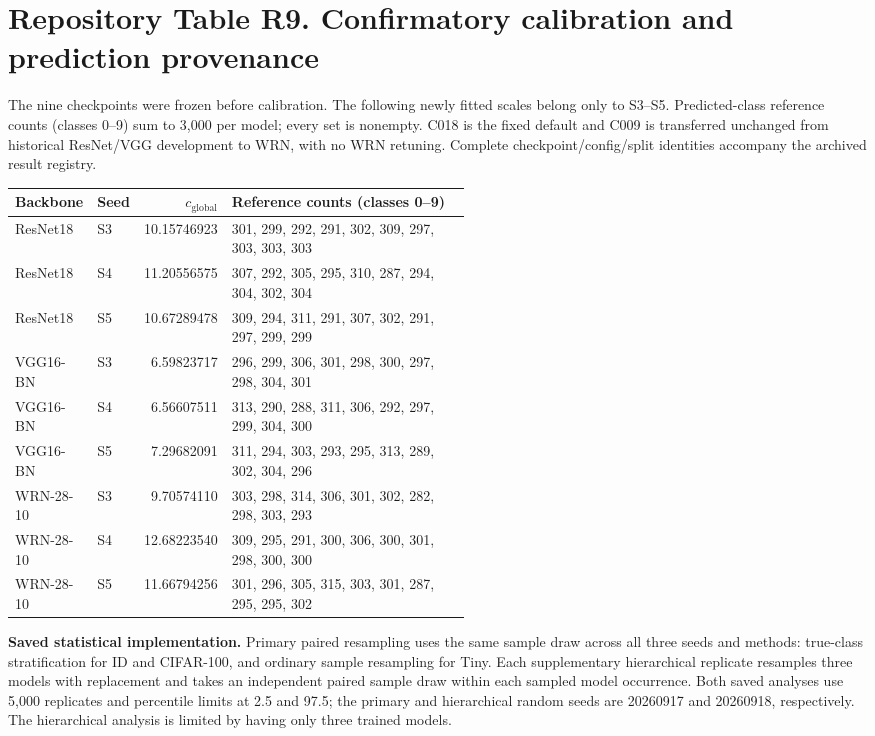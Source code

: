 \clearpage
\section*{Repository Table R9. Confirmatory calibration and prediction provenance}\label{tab:s9}
The nine checkpoints were frozen before calibration. The following newly fitted scales belong only to S3--S5. Predicted-class reference counts (classes 0--9) sum to 3,000 per model; every set is nonempty. C018 is the fixed default and C009 is transferred unchanged from historical ResNet/VGG development to WRN, with no WRN retuning. Complete checkpoint/config/split identities accompany the archived result registry.
\begingroup
\footnotesize
\setlength{\tabcolsep}{3pt}
\renewcommand{\arraystretch}{1.1}
\begin{longtable}{@{}llrp{0.53\linewidth}@{}}
\toprule
Backbone & Seed & $c_{\mathrm{global}}$ & Reference counts (classes 0--9) \\
\midrule
\endhead
\bottomrule
\endlastfoot
ResNet18 & S3 & 10.15746923 & 301, 299, 292, 291, 302, 309, 297, 303, 303, 303 \\
ResNet18 & S4 & 11.20556575 & 307, 292, 305, 295, 310, 287, 294, 304, 302, 304 \\
ResNet18 & S5 & 10.67289478 & 309, 294, 311, 291, 307, 302, 291, 297, 299, 299 \\
VGG16-BN & S3 & 6.59823717 & 296, 299, 306, 301, 298, 300, 297, 298, 304, 301 \\
VGG16-BN & S4 & 6.56607511 & 313, 290, 288, 311, 306, 292, 297, 299, 304, 300 \\
VGG16-BN & S5 & 7.29682091 & 311, 294, 303, 293, 295, 313, 289, 302, 304, 296 \\
WRN-28-10 & S3 & 9.70574110 & 303, 298, 314, 306, 301, 302, 282, 298, 303, 293 \\
WRN-28-10 & S4 & 12.68223540 & 309, 295, 291, 300, 306, 300, 301, 298, 300, 300 \\
WRN-28-10 & S5 & 11.66794256 & 301, 296, 305, 315, 303, 301, 287, 295, 295, 302 \\
\end{longtable}
\endgroup

\textbf{Saved statistical implementation.} Primary paired resampling uses the same sample draw across all three seeds and methods: true-class stratification for ID and CIFAR-100, and ordinary sample resampling for Tiny. Each supplementary hierarchical replicate resamples three models with replacement and takes an independent paired sample draw within each sampled model occurrence. Both saved analyses use 5,000 replicates and percentile limits at 2.5 and 97.5; the primary and hierarchical random seeds are 20260917 and 20260918, respectively. The hierarchical analysis is limited by having only three trained models.

